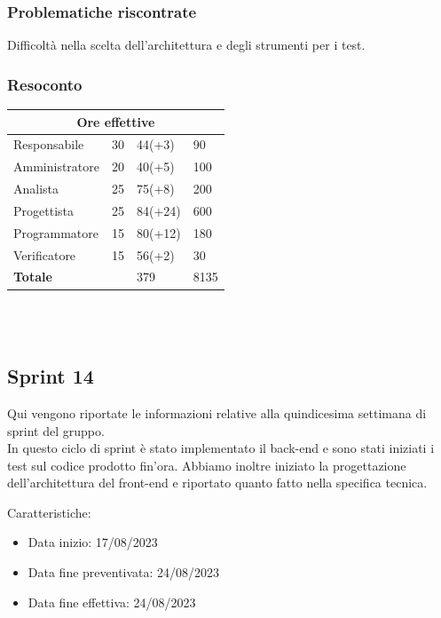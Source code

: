 \documentclass[9pt]{article}
\begin{document}
\subsubsection{Problematiche riscontrate}
Difficoltà nella scelta dell'architettura e degli strumenti per i test.


\subsubsection{Resoconto}
\begin{center}
	\begin{tabularx}{\textwidth}{|X|X|X|X|}
		\hline
		\multicolumn{4}{|c|}{\textbf{Ore effettive}}                                      \\
		\hline														
		Responsabile		&		30		&		44(+3)		&		90		\\
		\hline														
		Amministratore		&		20		&		40(+5)		&		100		\\
		\hline														
		Analista		&		25		&		75(+8)		&		200		\\
		\hline														
		Progettista		&		25		&		84(+24)		&		600		\\
		\hline														
		Programmatore		&		15		&		80(+12)		&		180		\\
		\hline														
		Verificatore		&		15		&		56(+2)		&		30		\\
		\hline														
		\hline														
		\textbf{Totale}		&				&		379		&		8135		\\
		\hline																										
	\end{tabularx}\\[8pt]
	\mbox{}\\
\end{center}

\subsection{Sprint 14}
Qui vengono riportate le informazioni relative alla quindicesima settimana di sprint del gruppo. \\
In questo ciclo di sprint è stato implementato il back-end e sono stati iniziati i test sul codice prodotto fin'ora.
Abbiamo inoltre iniziato la progettazione dell'architettura del front-end e riportato quanto fatto nella specifica tecnica. 

Caratteristiche:

\begin{itemize}
	\item Data inizio: 17/08/2023
	\item Data fine preventivata: 24/08/2023
	\item Data fine effettiva: 24/08/2023
\end{itemize}
\end{document}
